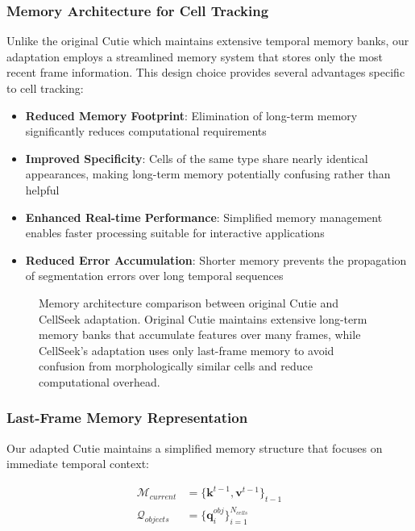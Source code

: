 \documentclass[../cellseek_paper.tex]{subfiles}
\begin{document}
\subsubsection{Memory Architecture for Cell Tracking}

Unlike the original Cutie which maintains extensive temporal memory banks, our adaptation employs a streamlined memory system that stores only the most recent frame information. This design choice provides several advantages specific to cell tracking:

\begin{itemize}
  \item \textbf{Reduced Memory Footprint}: Elimination of long-term memory significantly reduces computational requirements
  \item \textbf{Improved Specificity}: Cells of the same type share nearly identical appearances, making long-term memory potentially confusing rather than helpful
  \item \textbf{Enhanced Real-time Performance}: Simplified memory management enables faster processing suitable for interactive applications
  \item \textbf{Reduced Error Accumulation}: Shorter memory prevents the propagation of segmentation errors over long temporal sequences
\end{itemize}

\begin{figure}[h!]
  \centering
  
  \caption{Memory architecture comparison between original Cutie and CellSeek adaptation. Original Cutie maintains extensive long-term memory banks that accumulate features over many frames, while CellSeek's adaptation uses only last-frame memory to avoid confusion from morphologically similar cells and reduce computational overhead.}
  \label{fig:memory_comparison}
\end{figure}

\subsubsection{Last-Frame Memory Representation}

Our adapted Cutie maintains a simplified memory structure that focuses on immediate temporal context:

\begin{align}
  \mathcal{M}_{current} & = \{\mathbf{k}^{t-1}, \mathbf{v}^{t-1}\}_{t-1} \\
  \mathcal{Q}_{objects} & = \{\mathbf{q}_i^{obj}\}_{i=1}^{N_{cells}}
\end{align}
\end{document}
